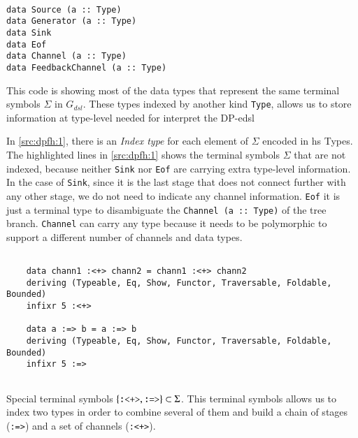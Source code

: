 \begin{listing}[H]
  \begin{verbatim}

data Source (a :: Type)
data Generator (a :: Type)
data Sink
data Eof
data Channel (a :: Type)
data FeedbackChannel (a :: Type)

  \end{verbatim}
  \caption[{[\texttt{Flow.hs}] $\Sigma$ enconding of $G_{dsl}$}]{This code is showing most of the data types that represent the same terminal symbols $\Sigma$ in $G_{dsl}$. These types indexed by another kind \texttt{Type}, allows us to store information at type-level needed for interpret the DP-\acrshort{edsl}}
  \label{src:dpfh:1}
\end{listing}
  
In \autoref{src:dpfh:1}, there is an \emph{Index type} for each element of $\Sigma$ encoded in \acrshort{hs} Types.
The highlighted lines in \autoref{src:dpfh:1} shows the terminal symbols $\Sigma$ that are not indexed, because neither \texttt{Sink} nor \texttt{Eof} are carrying extra type-level information. 
In the case of \texttt{Sink}, since it is the last stage that does not connect further with any other stage, we do not need to indicate any channel information. 
\texttt{Eof} it is just a terminal type to disambiguate the \texttt{Channel (a :: Type)} of the tree branch. 
\texttt{Channel} can carry any type because it needs to be polymorphic to support a different number of channels and data types.

\begin{listing}[H]
  \begin{verbatim}
    
    data chann1 :<+> chann2 = chann1 :<+> chann2
    deriving (Typeable, Eq, Show, Functor, Traversable, Foldable, Bounded)
    infixr 5 :<+>
    
    data a :=> b = a :=> b
    deriving (Typeable, Eq, Show, Functor, Traversable, Foldable, Bounded)
    infixr 5 :=>
    
  \end{verbatim}
  \caption[{[\texttt{Flow.hs}] $\Sigma$ enconding of $G_{dsl}$ - Especial non-terminals}]{Special terminal symbols $\{\text{\texttt{:<+>}}, \text{\texttt{:=>}}\} \subset \Sigma$. This terminal symbols allows us to index two types in order to combine several of them and build a chain of stages (\texttt{:=>}) and a set of channels (\texttt{:<+>}).}
  \label{src:dpfh:2}
\end{listing}

